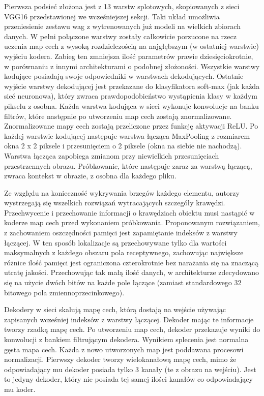 \documentclass[12pt,a4paper,twoside,titlepage,openright]{book}
\begin{document}
Pierwsza podsieć złożona jest z 13 warstw splotowych, skopiowanych z sieci VGG16 przedstawionej we wcześniejszej sekcji. Taki układ umożliwia przeniesienie zestawu wag z wytrenowanych już modeli na wielkich zbiorach danych. W pełni połączone warstwy zostały całkowicie porzucone na rzecz uczenia map cech z wysoką rozdzielczością na najgłębszym (w ostatniej warstwie) wyjściu kodera. Zabieg ten zmniejsza ilość parametrów prawie dziesięciokrotnie, w porównaniu z innymi architekturami o podobnej złożoności. Wszystkie warstwy kodujące posiadają swoje odpowiedniki w warstwach dekodujących. Ostatnie wyjście warstwy dekodującej jest przekazane do klasyfikatora soft-max (jak każda sieć neuronowa), który zwraca prawdopodobieństwo wystąpienia klasy w każdym pikselu z osobna.
Każda warstwa kodująca w sieci wykonuje konwolucje na banku filtrów, które następnie po utworzeniu map cech zostają znormalizowane. Znormalizowane mapy cech zostają przeliczone przez funkcję aktywacji ReLU. Po każdej warstwie kodującej następuje warstwa łącząca MaxPooling z rozmiarem okna 2 x 2 piksele i przesunięciem o 2 piksele (okna na siebie nie nachodzą). Warstwa łącząca zapobiega zmianom przy niewielkich przesunięciach przestrzennych obrazu. Próbkowanie, które następuje zaraz za warstwą łączącą, zwraca kontekst w obrazie, z osobna dla każdego pliku.

Ze względu na konieczność wykrywania brzegów każdego elementu, autorzy wystrzegają się wszelkich rozwiązań wytracających szczegóły krawędzi. Przechwycenie i przechowanie informacji o krawędziach obiektu musi nastąpić w koderze map cech przed wykonaniem próbkowania. Proponowanym rozwiązaniem, z zachowaniem oszczędności pamięci jest zapamiętanie indeksów z warstwy łączącej. W ten sposób lokalizacje są przechowywane tylko dla wartości maksymalnych z każdego obszaru pola receptywnego, zachowując największe różnice ilość pamięci jest ograniczona czterokrotnie bez narażania się na znaczącą utratę jakości. Przechowując tak małą ilość danych, w architekturze zdecydowano się na użycie dwóch bitów na każde pole łączące (zamiast standardowego 32 bitowego pola zmiennoprzecinkowego).

Dekodery w sieci skalują mapę cech, którą dostają na wejście używając zapisanych wcześniej indeksów z warstwy łączącej. Dekoder mając te informacje tworzy rzadką mapę cech. Po utworzeniu map cech, dekoder przekazuje wyniki do konwolucji z bankiem filtrującym dekodera. Wynikiem splecenia jest normalna gęsta mapa cech. Każda z nowo utworzonych map jest poddawana procesowi normalizacji. Pierwszy dekoder tworzy wielokanałową mapę cech, mimo że odpowiadający mu dekoder posiada tylko 3 kanały (te z obrazu na wejściu). Jest to jedyny dekoder, który nie posiada tej samej ilości kanałów co odpowiadający mu koder.
\end{document}

